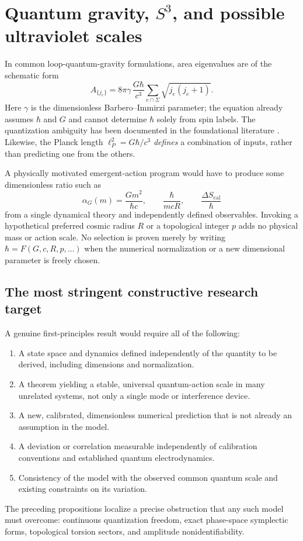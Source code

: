 \documentclass[11pt,a4paper]{article}
\newcommand{\h}{\hbar}
\begin{document}
\section{Quantum gravity, $S^3$, and possible ultraviolet scales}
In common loop-quantum-gravity formulations, area eigenvalues are of the schematic form
\begin{equation}\label{eq:lqg}
 A_{\{j_e\}}=8\pi\gamma\,\frac{G\h}{c^3}\sum_{e\cap\Sigma}\sqrt{j_e(j_e+1)}.
\end{equation}
Here $\gamma$ is the dimensionless Barbero--Immirzi parameter; the equation already assumes $\h$ and $G$ and cannot determine $\h$ solely from spin labels. The quantization ambiguity has been documented in the foundational literature \cite{RovelliThiemann}. Likewise, the Planck length $\ell_P^2=G\h/c^3$ \emph{defines} a combination of inputs, rather than predicting one from the others.

A physically motivated emergent-action program would have to produce some dimensionless ratio such as
\begin{equation}\label{eq:alphag}
 \alpha_G(m)=\frac{Gm^2}{\h c},\qquad
 \frac{\h}{mcR},\qquad
 \frac{\Delta S_{\mathrm{cal}}}{\h}
\end{equation}
from a single dynamical theory and independently defined observables. Invoking a hypothetical preferred cosmic radius $R$ or a topological integer $p$ adds no physical mass or action scale. No selection is proven merely by writing $\h=F(G,c,R,p,\ldots)$ when the numerical normalization or a new dimensional parameter is freely chosen.

\subsection{The most stringent constructive research target}
A genuine first-principles result would require all of the following:
\begin{enumerate}
\item A state space and dynamics defined independently of the quantity to be derived, including dimensions and normalization.
\item A theorem yielding a stable, universal quantum-action scale in many unrelated systems, not only a single mode or interference device.
\item A new, calibrated, dimensionless numerical prediction that is not already an assumption in the model.
\item A deviation or correlation measurable independently of calibration conventions and established quantum electrodynamics.
\item Consistency of the model with the observed common quantum scale and existing constraints on its variation.
\end{enumerate}
The preceding propositions localize a precise obstruction that any such model must overcome: continuous quantization freedom, exact phase-space symplectic forms, topological torsion sectors, and amplitude nonidentifiability.
\end{document}
